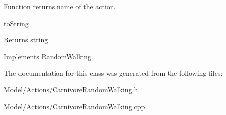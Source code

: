 Function returns name of the action. 

to\+String \begin{DoxyReturn}{Returns}
string 
\end{DoxyReturn}


Implements \hyperlink{class_random_walking_a86f089cc5cc28d179e248c67477e8b30}{Random\+Walking}.



The documentation for this class was generated from the following files\+:\begin{DoxyCompactItemize}
\item 
Model/\+Actions/\hyperlink{_carnivore_random_walking_8h}{Carnivore\+Random\+Walking.\+h}\item 
Model/\+Actions/\hyperlink{_carnivore_random_walking_8cpp}{Carnivore\+Random\+Walking.\+cpp}\end{DoxyCompactItemize}
